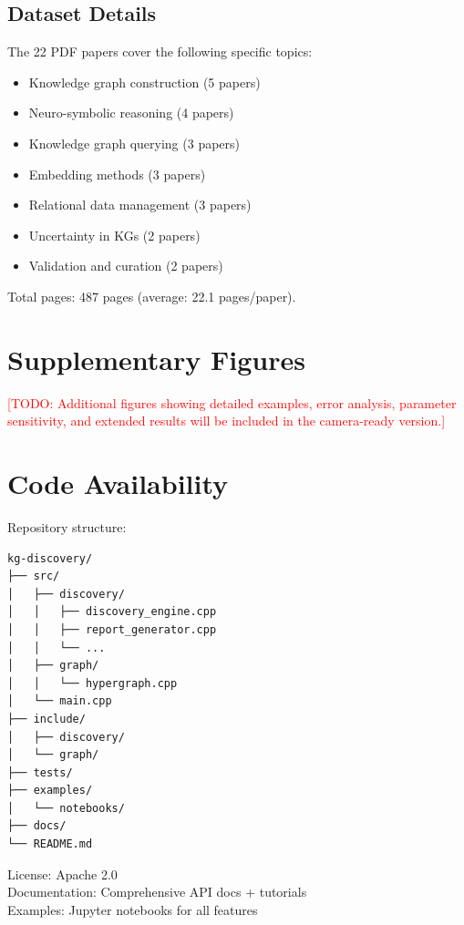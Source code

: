 \documentclass[11pt,twocolumn]{article}
\newcommand{\TODO}[1]{\textcolor{red}{[TODO: #1]}}
\begin{document}
\subsection{Dataset Details}

The 22 PDF papers cover the following specific topics:

\begin{itemize}
\item Knowledge graph construction (5 papers)
\item Neuro-symbolic reasoning (4 papers)
\item Knowledge graph querying (3 papers)
\item Embedding methods (3 papers)
\item Relational data management (3 papers)
\item Uncertainty in KGs (2 papers)
\item Validation and curation (2 papers)
\end{itemize}

Total pages: 487 pages (average: 22.1 pages/paper).

\section{Supplementary Figures}

\TODO{Additional figures showing detailed examples, error analysis, parameter sensitivity, and extended results will be included in the camera-ready version.}

\section{Code Availability}

Repository structure:
\begin{verbatim}
kg-discovery/
├── src/
│   ├── discovery/
│   │   ├── discovery_engine.cpp
│   │   ├── report_generator.cpp
│   │   └── ...
│   ├── graph/
│   │   └── hypergraph.cpp
│   └── main.cpp
├── include/
│   ├── discovery/
│   └── graph/
├── tests/
├── examples/
│   └── notebooks/
├── docs/
└── README.md
\end{verbatim}

License: Apache 2.0 \\
Documentation: Comprehensive API docs + tutorials \\
Examples: Jupyter notebooks for all features
\end{document}
